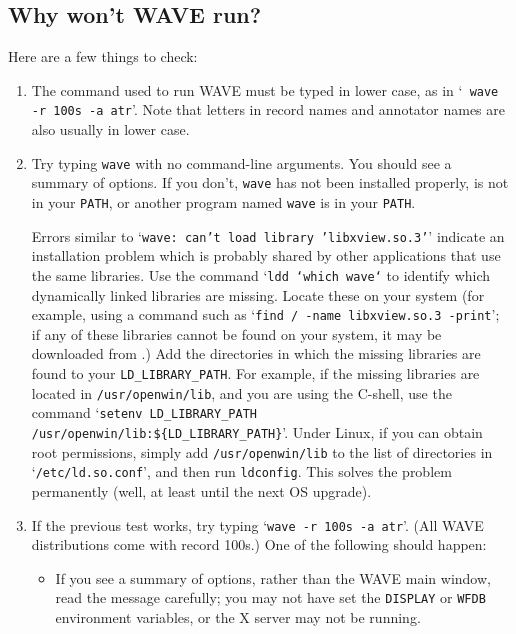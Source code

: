 \documentclass[twoside]{book}
\newcommand{\WAVE}{{\sf WAVE}\xspace}
\begin{document}
\subsection{Why won't \WAVE{} run?}

Here are a few things to check:

\begin{enumerate}
\item
{}
The command used to run \WAVE{} must be typed in lower case, as in `{\tt
wave -r 100s -a atr}'.  Note that letters in record names and
annotator names are also usually in lower case.

\item
{}
Try typing {\tt wave} with no command-line arguments.  You should see a summary
of options.  If you don't, {\tt wave} has not been installed properly, is not
in your {\tt PATH}, or another program named {\tt wave} is in your {\tt PATH}.

Errors similar to `{\tt wave: can't load library 'libxview.so.3'}'
indicate an installation problem which is probably shared by other
applications that use the same libraries.
Use the command `{\tt ldd `which wave`} to identify which dynamically
linked libraries are missing.  Locate these on your system (for
example, using a command such as `{\tt find / -name libxview.so.3
-print}';  if any of these libraries cannot be found on your system, it may be
downloaded from .)
Add the directories in which the missing libraries are found to your
{\tt LD\_LIBRARY\_PATH}.  For example, if the missing libraries are
located in {\tt /usr/openwin/lib}, and you are using the C-shell, use the
command `{\tt setenv LD\_LIBRARY\_PATH /usr/openwin/lib:\$\{LD\_LIBRARY\_PATH\}}'.
Under Linux, if you can obtain root permissions, simply add
{\tt /usr/openwin/lib} to the list of directories in `{\tt /etc/ld.so.conf}',
and then run {\tt ldconfig}.  This solves the problem permanently (well, at
least until the next OS upgrade).

\item
If the previous test works, try typing `{\tt wave -r 100s -a atr}'.  (All
\WAVE{} distributions come with record 100s.)  One of the following should
happen:
\begin{itemize}
\item
{}
If you see a summary of options, rather than the \WAVE{} main window, read
the message carefully;  you may not have set the {\tt DISPLAY} or {\tt WFDB}
environment variables, or the X server may not be running.


\end{itemize}
\end{enumerate}
\end{document}
